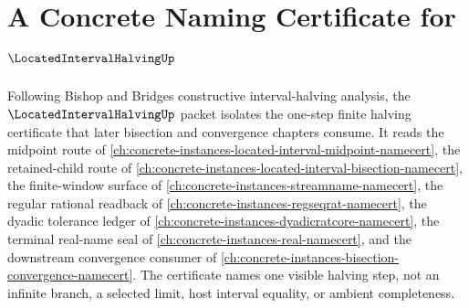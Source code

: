 \chapter{A Concrete Naming Certificate for $\LocatedIntervalHalvingUp$}
\label{ch:concrete-instances-located-interval-halving-namecert}

Following Bishop and Bridges constructive interval-halving analysis, the $\LocatedIntervalHalvingUp$ packet isolates the one-step finite halving certificate that later bisection and convergence chapters consume. It reads the midpoint route of \autoref{ch:concrete-instances-located-interval-midpoint-namecert}, the retained-child route of \autoref{ch:concrete-instances-located-interval-bisection-namecert}, the finite-window surface of \autoref{ch:concrete-instances-streamname-namecert}, the regular rational readback of \autoref{ch:concrete-instances-regseqrat-namecert}, the dyadic tolerance ledger of \autoref{ch:concrete-instances-dyadicratcore-namecert}, the terminal real-name seal of \autoref{ch:concrete-instances-real-namecert}, and the downstream convergence consumer of \autoref{ch:concrete-instances-bisection-convergence-namecert}. The certificate names one visible halving step, not an infinite branch, a selected limit, host interval equality, or ambient completeness.

